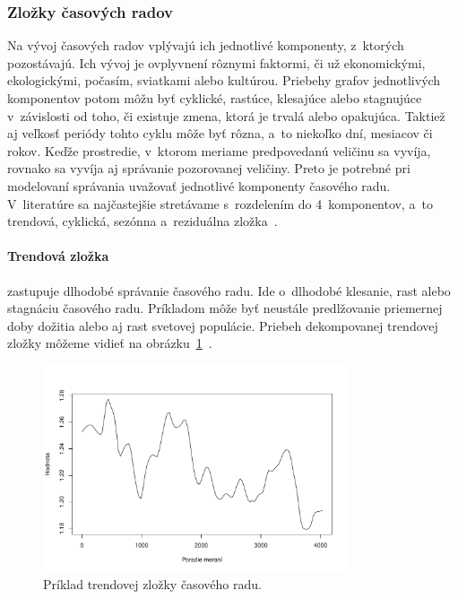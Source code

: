 \documentclass[a4paper,twoside,slovak,12pt,appendix]{article}
\begin{document}

\subsubsection{Zložky časových radov}
Na vývoj časových radov vplývajú ich jednotlivé komponenty, z~ktorých
pozostávajú. Ich vývoj je ovplyvnení rôznymi faktormi, či už ekonomickými,
ekologickými, počasím, sviatkami alebo kultúrou. Priebehy grafov jednotlivých
komponentov potom môžu byť cyklické, rastúce, klesajúce alebo stagnujúce
v~závislosti od toho, či existuje zmena, ktorá je trvalá alebo opakujúca.
Taktiež aj veľkosť periódy tohto cyklu môže byť rôzna, a~to niekoľko dní,
mesiacov či rokov. Keďže prostredie, v~ktorom meriame predpovedanú veličinu sa
vyvíja, rovnako sa vyvíja aj správanie pozorovanej veličiny. Preto je potrebné
pri modelovaní správania uvažovať jednotlivé komponenty časového radu.
V~literatúre sa najčastejšie stretávame s~rozdelením do 4~komponentov, a~to
trendová, cyklická, sezónna a~reziduálna zložka~\cite{Grmanova2016}.

\paragraph{Trendová zložka} zastupuje dlhodobé správanie časového radu. Ide
o~dlhodobé klesanie, rast alebo stagnáciu časového radu. Príkladom môže byť
neustále predlžovanie priemernej doby dožitia alebo aj rast svetovej populácie.
Priebeh dekompovanej trendovej zložky môžeme vidieť na
obrázku~\ref{fig:trend-component}~\cite{Agrawal2013}.

\begin{figure}[H]
  \centering
  \includegraphics[width=0.8\textwidth]{trend_component.pdf}
  \caption{Príklad trendovej zložky časového radu.}
  \label{fig:trend-component}
\end{figure}
\end{document}
